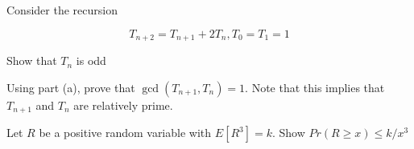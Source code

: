 \documentclass[12pt,oneside]{article}
\begin{document}

\begin{problem}{10}

Consider the recursion 

$$T_{n+2} = T_{n+1} + 2T_{n}, T_0 = T_1 = 1$$

\bparts
	 Show that $T_n$ is odd
	
	\vspace{4 in}
	
	 Using part (a), prove that $\gcd(T_{n+1}, T_{n}) = 1$.  Note that
	this implies that $T_{n+1}$ and $T_n$ are relatively prime.
\eparts

\end{problem}

\newpage

\begin{problem}{10}
Let $R$ be a positive random variable with $E[R^3] = k$. Show $Pr(R \geq x) \leq k/x^3$
\end{problem}

%
%
%
%
%
%
%
%
\end{document}
